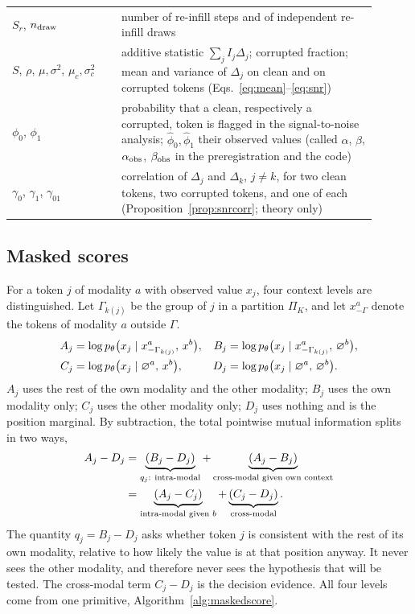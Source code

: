\begin{table}[t]
\begin{tabular}{p{0.27\linewidth}p{0.63\linewidth}}
$S_r$, $n_{\rm draw}$ & number of re-infill steps and of independent re-infill draws \\
$S$, $\rho$, $\mu,\sigma^2$, $\mu_c,\sigma^2_c$ & additive statistic $\sum_jI_j\Delta_j$; corrupted fraction; mean and variance of $\Delta_j$ on clean and on corrupted tokens (Eqs.~\ref{eq:mean}--\ref{eq:snr}) \\
$\phi_0$, $\phi_1$ & probability that a clean, respectively a corrupted, token is flagged in the signal-to-noise analysis; $\hat\phi_0,\hat\phi_1$ their observed values (called $\alpha$, $\beta$, $\alpha_{\rm obs}$, $\beta_{\rm obs}$ in the preregistration and the code) \\
$\gamma_0$, $\gamma_1$, $\gamma_{01}$ & correlation of $\Delta_j$ and $\Delta_k$, $j\neq k$, for two clean tokens, two corrupted tokens, and one of each (Proposition~\ref{prop:snrcorr}; theory only) \\
\bottomrule
\end{tabular}
\end{table}

\subsection{Masked scores}\label{ssec:scores}
For a token $j$ of modality $a$ with observed value $x_j$, four context levels are distinguished.
Let $\Gamma_{k(j)}$ be the group of $j$ in a partition $\Pi_K$, and let $x^a_{-\Gamma}$ denote the tokens of modality $a$ outside $\Gamma$.
\begin{align}
A_j &= \log p_\theta\big(x_j\mid x^a_{-\Gamma_{k(j)}},\,x^b\big), &
B_j &= \log p_\theta\big(x_j\mid x^a_{-\Gamma_{k(j)}},\,\varnothing^b\big),\notag\\
C_j &= \log p_\theta\big(x_j\mid \varnothing^a,\,x^b\big), &
D_j &= \log p_\theta\big(x_j\mid \varnothing^a,\,\varnothing^b\big).
\label{eq:levels}
\end{align}
$A_j$ uses the rest of the own modality and the other modality; $B_j$ uses the own modality only; $C_j$ uses the other
modality only; $D_j$ uses nothing and is the position marginal.
By subtraction, the total pointwise mutual information splits in two ways,
\begin{align}
A_j-D_j&=\underbrace{(B_j-D_j)}_{q_j:\ \text{intra-modal}}+\underbrace{(A_j-B_j)}_{\text{cross-modal given own context}}\notag\\
&=\underbrace{(A_j-C_j)}_{\text{intra-modal given }b}+\underbrace{(C_j-D_j)}_{\text{cross-modal}}.
\label{eq:pmi}
\end{align}
The quantity $q_j=B_j-D_j$ asks whether token $j$ is consistent with the rest of its own modality, relative to how likely
the value is at that position anyway.
It never sees the other modality, and therefore never sees the hypothesis that will be tested.
The cross-modal term $C_j-D_j$ is the decision evidence.
All four levels come from one primitive, Algorithm~\ref{alg:maskedscore}.

